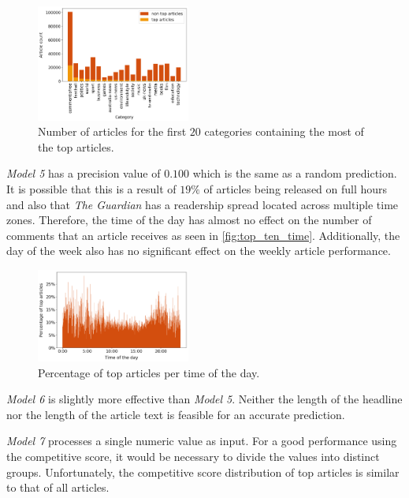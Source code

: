 \begin{figure}[h]
	\includegraphics[width=0.45\textwidth]{fig/top_ten_category.png}
	\caption{\textmd{Number of articles for the first $20$ categories containing the most of the top articles.}}
	\label{fig:top_ten_category}
\end{figure}

\textit{Model 5} has a precision value of $0.100$ which is the same as a random prediction.
It is possible that this is a result of $19\%$ of articles being released on full hours and also that \textit{The Guardian} has a readership spread located across multiple time zones.
Therefore, the time of the day has almost no effect on the number of comments that an article receives as seen in \autoref{fig:top_ten_time}. 
Additionally, the day of the week also has no significant effect on the weekly article performance. 

\begin{figure}[h]
	\includegraphics[width=0.45\textwidth]{fig/top_ten_time.png}
	\caption{\textmd{Percentage of top articles per time of the day.}}
	\label{fig:top_ten_time}
\end{figure}

\textit{Model 6} is slightly more effective than \textit{Model 5}. 
Neither the length of the headline nor the length of the article text is feasible for an accurate prediction.

\textit{Model 7} processes a single numeric value as input. 
For a good performance using the competitive score, it would be necessary to divide the values into distinct groups.
Unfortunately, the competitive score distribution of top articles is similar to that of all articles.

